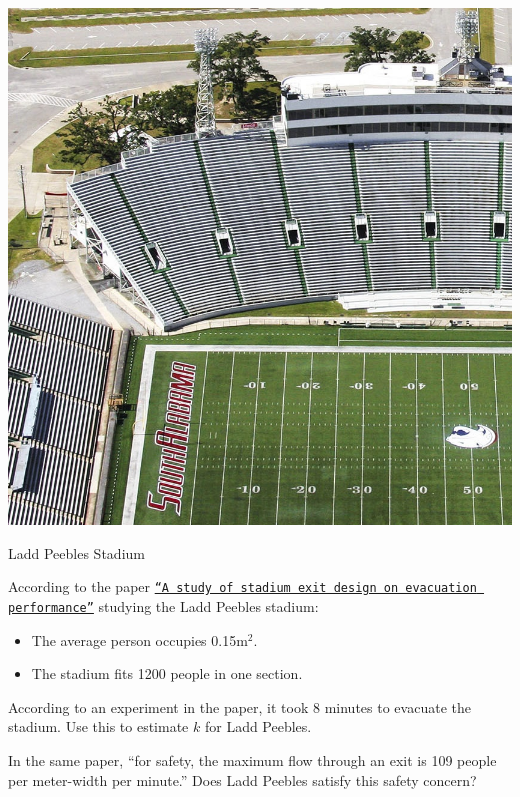 \documentclass{workbook}
\begin{document}
\begin{slide}

\question

\begin{center}
	\includegraphics[width=.4\textwidth]{images/Ladd_Stadium-cropped.jpg}
	
	Ladd Peebles Stadium
\end{center}

\begin{slidesonly}
	\bigskip
\end{slidesonly}

According to the paper \href{https://www.researchgate.net/publication/289492130_A_study_of_stadium_exit_design_on_evacuation_performance}{\tt ``A study of stadium exit design on evacuation performance''} studying the Ladd Peebles stadium:
\begin{itemize}
	\item The average person occupies 0.15m$^2$.
	\item The stadium fits 1200 people in one section.
\end{itemize}


\begin{parts}
	\item According to an experiment in the paper, it took 8 minutes to evacuate the stadium. Use this to estimate $k$ for Ladd Peebles.
	
	\item In the same paper, ``for safety, the maximum flow through an exit is 109 people per meter-width per minute.'' Does Ladd Peebles satisfy this safety concern?

\end{parts}

\end{slide}
\end{document}
